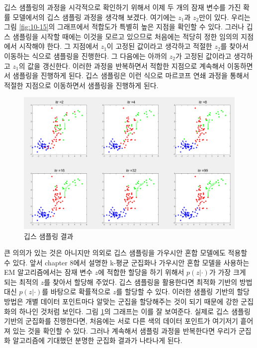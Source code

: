 \documentclass[a4paper]{oblivoir}
\begin{document}
깁스 샘플링의 과정을 시각적으로 확인하기 위해서 이제 두 개의 잠재 변수를 가진 확률 모델에서의 깁스 샘플링 과정을 생각해 보겠다. 여기에는  $z_1$과 $z_2$만이 있다. 우리는 그림 \ref{fig:10-15}의 그래프에서 적합도가 특별히 높은 지점을 확인할 수 있다. 그러나 깁스 샘플링을 시작할 때에는 이것을 모르고 있으므로 처음에는 적당히 정한 임의의 지점에서 시작해야 한다. 그 지점에서 $z_1$이 고정된 값이라고 생각하고 적절한 $z_2$를 찾아서 이동하는 식으로 샘플링을 진행한다. 그 다음에는 아까의 $z_2$가 고정된 값이라고 생각하고 $z_1$의 값을 갱신한다. 이러한 과정을 반복하면서 적합한 지점으로 계속해서 이동하면서 샘플링을 진행하게 된다. 깁스 샘플링은 이런 식으로 마르코프 연쇄 과정을 통해서 적절한 지점으로 이동하면서 샘플링을 진행하게 된다. \\

\begin{figure}[ht] \centering 
\includegraphics[scale=0.6]{fig10_15.png} 
\caption{깁스 샘플링 결과}
\label{fig:10-16}
\end{figure}

큰 의의가 있는 것은 아니지만 의외로 깁스 샘플링을 가우시안 혼합 모델에도 적용할 수 있다. 앞서 chapter 8에서 설명한 k-평균 군집화나 가우시안 혼합 모델을 사용하는 EM 알고리즘에서는 잠재 변수 $z$에 적합한 할당을 하기 위해서 $p(z|\cdot)$가 가장 크게 되는 최적의 $z$를 찾아서 할당해 주었다. 깁스 샘플링을 활용한다면 최적화 기반의 방법 대신 $p(z|\cdot)$를 바탕으로 확률적으로 $z$를 할당할 수 있다. 이러한 샘플링 기반의 할당 방법은 개별 데이터 포인트마다 알맞는 군집을 할당해주는 것이 되기 때문에 강한 군집화의 하나인 것처럼 보인다. 그림 \ref{fig:10-16}의 그래프는 이를 잘 보여준다. 실제로 깁스 샘플링 기반의 군집화를 진행한다면, 처음에는 서로 다른 색의 데이터 포인트가 여기저기 흩어져 있는 것을 확인할 수 있다. 그러나 계속해서 샘플링 과정을 반복한다면 우리가 군집화 알고리즘에 기대했던 분명한 군집화 결과가 나타나게 된다. \\
\end{document}
